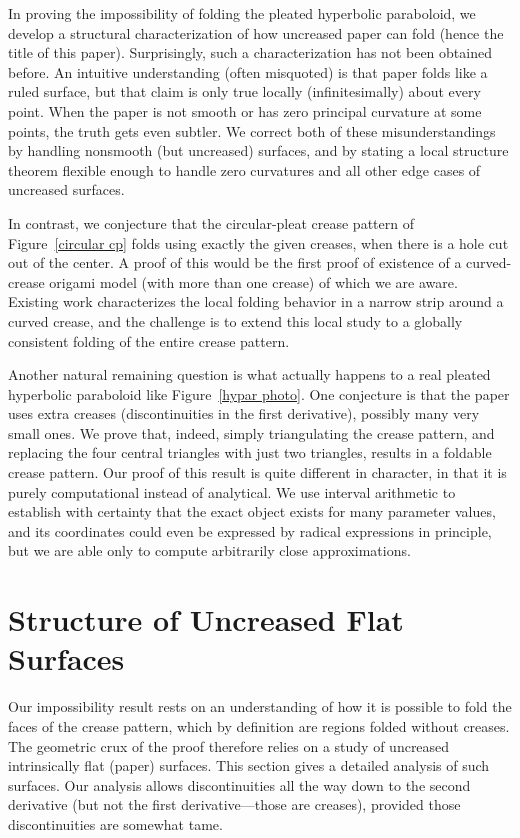 \documentclass[11pt,letterpaper]{article}
\begin{document}
In proving the impossibility of folding the pleated hyperbolic
paraboloid, we develop a structural characterization of how uncreased
paper can fold (hence the title of this paper).  Surprisingly, such a
characterization has not been obtained before.  An intuitive
understanding (often misquoted) is that paper folds like a ruled
surface, but that claim is only true locally (infinitesimally) about
every point.  When the paper is not smooth or has zero principal
curvature at some points, the truth gets even subtler.  We correct
both of these misunderstandings by handling nonsmooth (but uncreased)
surfaces, and by stating a local structure theorem flexible enough to
handle zero curvatures and all other edge cases of uncreased surfaces.

In contrast, we conjecture that the circular-pleat crease pattern of
Figure~\ref{circular cp} folds using exactly the given creases, when
there is a hole cut out of the center.  A proof of this would be the
first proof of existence of a curved-crease origami model (with more
than one crease) of which we are aware.  Existing work characterizes
the local folding behavior in a narrow strip around a curved crease,
and the challenge is to extend this local study to a globally consistent
folding of the entire crease pattern.

Another natural remaining question is what actually happens to a real
pleated hyperbolic paraboloid like Figure~\ref{hypar photo}.
One conjecture is that the paper uses extra creases (discontinuities
in the first derivative), possibly many very small ones.
We prove that, indeed, simply triangulating the crease pattern,
and replacing the four central triangles with just two triangles,
results in a foldable crease pattern.
Our proof of this result is quite different in character,
in that it is purely computational instead of analytical.
We use interval arithmetic to establish with certainty that the
exact object exists for many parameter values, and its coordinates
could even be expressed by radical expressions in principle,
but we are able only to compute arbitrarily close approximations.



\section{Structure of Uncreased Flat Surfaces}

Our impossibility result rests on an understanding of how it is possible
to fold the faces of the crease pattern, which by definition are regions
folded without creases.  The geometric crux of the proof therefore relies
on a study of uncreased intrinsically flat (paper) surfaces.
This section gives a detailed analysis of such surfaces.
Our analysis allows discontinuities all the way down to the second derivative
(but not the first derivative---those are creases),
provided those discontinuities are somewhat tame.
\end{document}
